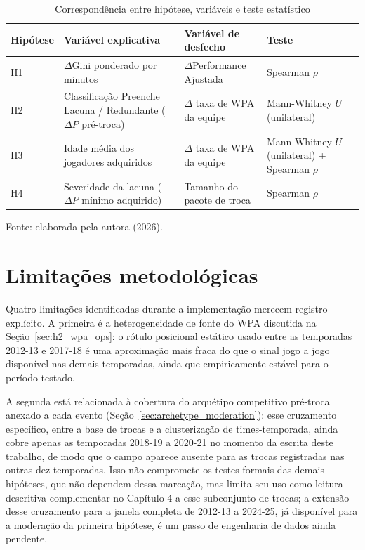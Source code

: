 \begin{table}[htb]
    \centering
    \caption{Correspondência entre hipótese, variáveis e teste estatístico}
    \label{tab:hipoteses_testes}
    \begin{tabular}{|p{2.0cm}|p{5.0cm}|p{4.3cm}|p{3.3cm}|}
    \hline
    \textbf{Hipótese} & \textbf{Variável explicativa} & \textbf{Variável de desfecho} & \textbf{Teste} \\
    \hline
    H1 & $\Delta$Gini ponderado por minutos & $\Delta$Performance Ajustada & Spearman $\rho$ \\
    \hline
    H2 & Classificação Preenche Lacuna / Redundante ($\Delta P$ pré-troca) & $\Delta$ taxa de WPA da equipe & Mann-Whitney $U$ (unilateral) \\
    \hline
    H3 & Idade média dos jogadores adquiridos & $\Delta$ taxa de WPA da equipe & Mann-Whitney $U$ (unilateral) + Spearman $\rho$ \\
    \hline
    H4 & Severidade da lacuna ($\Delta P$ mínimo adquirido) & Tamanho do pacote de troca & Spearman $\rho$ \\
    \hline
    \end{tabular}
    \begin{flushleft}
    \footnotesize Fonte: elaborada pela autora (2026).
    \end{flushleft}
\end{table}

\section{Limitações metodológicas}
\label{sec:method_limitations}

Quatro limitações identificadas durante a implementação merecem registro explícito. A primeira é a heterogeneidade de fonte do WPA discutida na Seção~\ref{sec:h2_wpa_ops}: o rótulo posicional estático usado entre as temporadas 2012-13 e 2017-18 é uma aproximação mais fraca do que o sinal jogo a jogo disponível nas demais temporadas, ainda que empiricamente estável para o período testado.

A segunda está relacionada à cobertura do arquétipo competitivo pré-troca anexado a cada evento (Seção~\ref{sec:archetype_moderation}): esse cruzamento específico, entre a base de trocas e a clusterização de times-temporada, ainda cobre apenas as temporadas 2018-19 a 2020-21 no momento da escrita deste trabalho, de modo que o campo aparece ausente para as trocas registradas nas outras dez temporadas. Isso não compromete os testes formais das demais hipóteses, que não dependem dessa marcação, mas limita seu uso como leitura descritiva complementar no Capítulo 4 a esse subconjunto de trocas; a extensão desse cruzamento para a janela completa de 2012-13 a 2024-25, já disponível para a moderação da primeira hipótese, é um passo de engenharia de dados ainda pendente.

